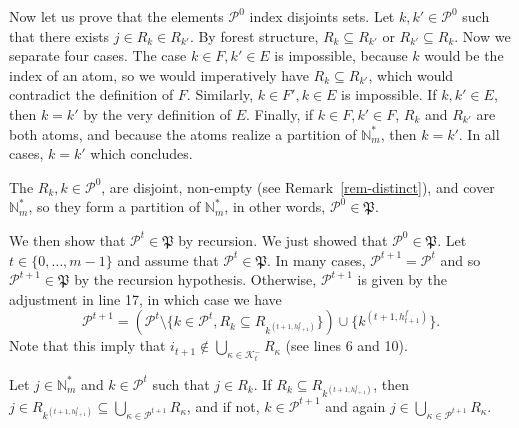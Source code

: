 \documentclass[
  11pt,
  a4paper,
]{article}
\theoremstyle{definition}
\theoremstyle{plain}
\theoremstyle{plain}
\theoremstyle{plain}
\theoremstyle{definition}
\theoremstyle{remark}
\begin{document}
Now let us prove that the elements \(\mathcal{P}^0\) index disjoints
sets. Let \(k, k'\in \mathcal{P}^0\) such that there exists
\(j\in R_{k}\in R_{k'}\). By forest structure, \(R_{k}\subseteq R_{k'}\)
or \(R_{k'}\subseteq R_{k}\). Now we separate four cases. The case
\(k\in F, k'\in E\) is impossible, because \(k\) would be the index of
an atom, so we would imperatively have \(R_{k}\subseteq R_{k'}\), which
would contradict the definition of \(F\). Similarly, \(k\in F', k\in E\)
is impossible. If \(k, k'\in E\), then \(k=k'\) by the very definition
of \(E\). Finally, if \(k\in F, k'\in F\), \(R_k\) and \(R_{k'}\) are
both atoms, and because the atoms realize a partition of
\(\mathbb{N}_m^*\), then \(k=k'\). In all cases, \(k=k'\) which
concludes.

The \(R_k, k\in \mathcal{P}^0\), are disjoint, non-empty (see
Remark~\ref{rem-distinct}), and cover \(\mathbb{N}_m^*\), so they form a
partition of \(\mathbb{N}_m^*\), in other words,
\(\mathcal{P}^0\in\mathfrak P\).

We then show that \(\mathcal{P}^t\in\mathfrak P\) by recursion. We just
showed that \(\mathcal{P}^0\in\mathfrak P\). Let
\(t\in\{ 0,\dotsc,m-1\}\) and assume that
\(\mathcal{P}^t\in\mathfrak P\). In many cases,
\(\mathcal{P}^{t+1}=\mathcal{P}^t\) and so
\(\mathcal{P}^{t+1}\in\mathfrak P\) by the recursion hypothesis.
Otherwise, \(\mathcal{P}^{t+1}\) is given by the adjustment in line 17,
in which case we have \begin{equation}\label{eq_rel_rec_p}
\mathcal{P}^{t+1}=\left(\mathcal{P}^t \setminus\{k\in\mathcal{P}^t, R_k\subseteq R_{  k^{(t+1,h^f_{t+1})}   }   \}  \right)\cup \{ k^{(t+1,h^f_{t+1})} \}.
\end{equation} Note that this imply that
\(i_{t+1}\not\in\bigcup_{\kappa \in \mathcal{K}^-_t} R_{\kappa}\) (see
lines 6 and 10).

Let \(j\in\mathbb{N}_m^*\) and \(k\in\mathcal{P}^t\) such that
\(j\in R_k\). If \(R_k\subseteq R_{  k^{(t+1,h^f_{t+1})}   }\), then
\(j\in R_{  k^{(t+1,h^f_{t+1})}   }\subseteq \bigcup_{\kappa\in \mathcal{P}^{t+1}} R_{\kappa}\),
and if not, \(k\in\mathcal{P}^{t+1}\) and again
\(j\in \bigcup_{\kappa\in \mathcal{P}^{t+1}} R_{\kappa}\).
\end{document}
